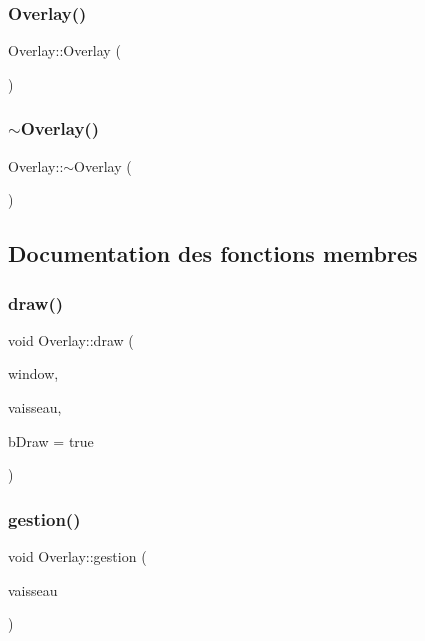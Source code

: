 \subsubsection{\texorpdfstring{Overlay()}{Overlay()}}
{\footnotesize\ttfamily Overlay\+::\+Overlay (\begin{DoxyParamCaption}{ }\end{DoxyParamCaption})}

\mbox{\label{class_overlay_ad40a5e109ee4acbdec9f21d5496b7fa9}} 
\subsubsection{\texorpdfstring{$\sim$\+Overlay()}{~Overlay()}}
{\footnotesize\ttfamily Overlay\+::$\sim$\+Overlay (\begin{DoxyParamCaption}{ }\end{DoxyParamCaption})}



\subsection{Documentation des fonctions membres}
\mbox{\label{class_overlay_a264955d57ee1b8c3d655321f26802e18}} 
\subsubsection{\texorpdfstring{draw()}{draw()}}
{\footnotesize\ttfamily void Overlay\+::draw (\begin{DoxyParamCaption}\item[{sf\+::\+Render\+Window \&}]{window,  }\item[{\hyperlink{class_vaisseau}{Vaisseau} $\ast$}]{vaisseau,  }\item[{bool}]{b\+Draw = {\ttfamily true} }\end{DoxyParamCaption})}

\mbox{\label{class_overlay_a39d341f16ea50172a8c2add7bfdf2843}} 
\subsubsection{\texorpdfstring{gestion()}{gestion()}}
{\footnotesize\ttfamily void Overlay\+::gestion (\begin{DoxyParamCaption}\item[{\hyperlink{class_vaisseau}{Vaisseau} $\ast$}]{vaisseau }\end{DoxyParamCaption})}

